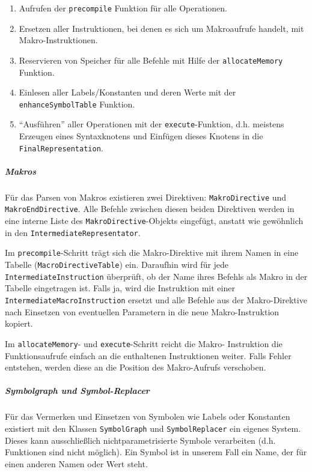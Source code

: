 \begin{enumerate}
	\item Aufrufen der \texttt{precompile} Funktion für alle Operationen. \item
	Ersetzen aller Instruktionen, bei denen es sich um Makroaufrufe handelt, mit
	Makro-Instruktionen. \item Reservieren von Speicher für alle Befehle mit
	Hilfe der \texttt{allocateMemory} Funktion. \item Einlesen aller
	Labels/Konstanten und deren Werte mit der \texttt{enhanceSymbolTable}
	Funktion. \item "`Ausführen"' aller Operationen mit der
	\texttt{execute}-Funktion, d.h. meistens Erzeugen eines Syntaxknotens und
	Einfügen dieses Knotens in die \texttt{FinalRepresentation}.
\end{enumerate}

\subparagraph{Makros} Für das Parsen von Makros existieren zwei Direktiven:
\texttt{Makro\-Directive} und \texttt{Makro\-End\-Directive}. Alle Befehle
zwischen diesen beiden Direktiven werden in eine interne Liste des
\texttt{Makro\-Directive}-Objekts eingefügt, anstatt wie gewöhnlich in den
\texttt{Intermediate\-Representator}.

Im \texttt{precompile}-Schritt trägt sich die Makro-Direktive mit ihrem Namen in
eine Tabelle (\texttt{Macro\-Directive\-Table}) ein. Daraufhin wird für jede
\texttt{Intermediate\-Instruction} überprüft, ob der Name ihres Befehls als
Makro in der Tabelle eingetragen ist. Falls ja, wird die Instruktion mit einer
\texttt{Intermediate\-Macro\-Instruction} ersetzt und alle Befehle aus der
Makro-Direktive nach Einsetzen von eventuellen Parametern in die neue
Makro-Instruktion kopiert.

Im \texttt{allocateMemory}- und \texttt{execute}-Schritt reicht die Makro-
Instruktion die Funktionsaufrufe einfach an die enthaltenen Instruktionen
weiter. Falls Fehler entstehen, werden diese an die Position des Makro-Aufrufs
verschoben.

\subparagraph{Symbolgraph und Symbol-Replacer} Für das Vermerken und Einsetzen
von Symbolen wie Labels oder Konstanten existiert mit den Klassen
\texttt{SymbolGraph} und \texttt{SymbolReplacer} ein eigenes System. Dieses kann
ausschließlich nichtparametrisierte Symbole verarbeiten (d.h. Funktionen sind
nicht möglich). Ein Symbol ist in unserem Fall ein Name, der für einen anderen
Namen oder Wert steht.

